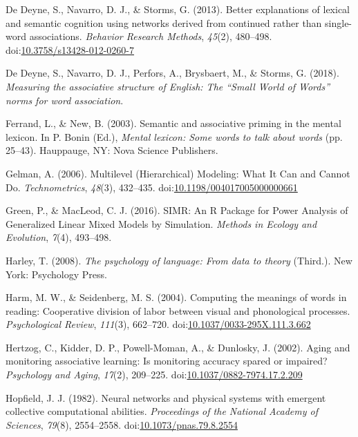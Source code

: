 \documentclass[english,man]{apa6}
\theoremstyle{definition}
\theoremstyle{definition}
\theoremstyle{definition}
\theoremstyle{remark}
\begin{document}
\hypertarget{ref-DeDeyne2013}{}
De Deyne, S., Navarro, D. J., \& Storms, G. (2013). Better explanations
of lexical and semantic cognition using networks derived from continued
rather than single-word associations. \emph{Behavior Research Methods},
\emph{45}(2), 480--498.
doi:\href{https://doi.org/10.3758/s13428-012-0260-7}{10.3758/s13428-012-0260-7}

\hypertarget{ref-DeDeyne2018}{}
De Deyne, S., Navarro, D. J., Perfors, A., Brysbaert, M., \& Storms, G.
(2018). \emph{Measuring the associative structure of English: The
``Small World of Words'' norms for word association}.

\hypertarget{ref-Ferrand2003}{}
Ferrand, L., \& New, B. (2003). Semantic and associative priming in the
mental lexicon. In P. Bonin (Ed.), \emph{Mental lexicon: Some words to
talk about words} (pp. 25--43). Hauppauge, NY: Nova Science Publishers.

\hypertarget{ref-Gelman2006}{}
Gelman, A. (2006). Multilevel (Hierarchical) Modeling: What It Can and
Cannot Do. \emph{Technometrics}, \emph{48}(3), 432--435.
doi:\href{https://doi.org/10.1198/004017005000000661}{10.1198/004017005000000661}

\hypertarget{ref-Green2016}{}
Green, P., \& MacLeod, C. J. (2016). SIMR: An R Package for Power
Analysis of Generalized Linear Mixed Models by Simulation. \emph{Methods
in Ecology and Evolution}, \emph{7}(4), 493--498.

\hypertarget{ref-Harley2008}{}
Harley, T. (2008). \emph{The psychology of language: From data to
theory} (Third.). New York: Psychology Press.

\hypertarget{ref-Harm2004}{}
Harm, M. W., \& Seidenberg, M. S. (2004). Computing the meanings of
words in reading: Cooperative division of labor between visual and
phonological processes. \emph{Psychological Review}, \emph{111}(3),
662--720.
doi:\href{https://doi.org/10.1037/0033-295X.111.3.662}{10.1037/0033-295X.111.3.662}

\hypertarget{ref-Hertzog2002}{}
Hertzog, C., Kidder, D. P., Powell-Moman, A., \& Dunlosky, J. (2002).
Aging and monitoring associative learning: Is monitoring accuracy spared
or impaired? \emph{Psychology and Aging}, \emph{17}(2), 209--225.
doi:\href{https://doi.org/10.1037/0882-7974.17.2.209}{10.1037/0882-7974.17.2.209}

\hypertarget{ref-Hopfield1982}{}
Hopfield, J. J. (1982). Neural networks and physical systems with
emergent collective computational abilities. \emph{Proceedings of the
National Academy of Sciences}, \emph{79}(8), 2554--2558.
doi:\href{https://doi.org/10.1073/pnas.79.8.2554}{10.1073/pnas.79.8.2554}
\end{document}
